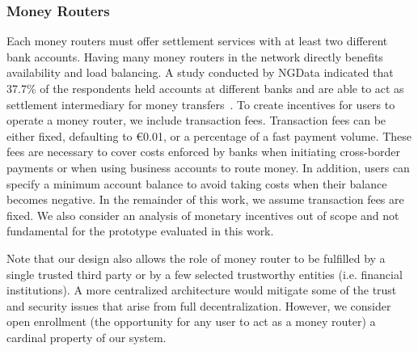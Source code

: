 \subsubsection*{Money Routers}
Each money routers must offer settlement services with at least two different bank accounts.
Having many money routers in the network directly benefits availability and load balancing.
A study conducted by NGData indicated that 37.7\% of the respondents held accounts at different banks and are able to act as settlement intermediary for money transfers~\cite{ngdata2014consumer}.
To create incentives for users to operate a money router, we include transaction fees.
Transaction fees can be either fixed, defaulting to \euro 0.01, or a percentage of a fast payment volume.
These fees are necessary to cover costs enforced by banks when initiating cross-border payments or when using business accounts to route money.
In addition, users can specify a minimum account balance to avoid taking costs when their balance becomes negative.
In the remainder of this work, we assume transaction fees are fixed.
We also consider an analysis of monetary incentives out of scope and not fundamental for the prototype evaluated in this work.

Note that our design also allows the role of money router to be fulfilled by a single trusted third party or by a few selected trustworthy entities (i.e. financial institutions).
A more centralized architecture would mitigate some of the trust and security issues that arise from full decentralization.
However, we consider open enrollment (the opportunity for any user to act as a money router) a cardinal property of our system.

